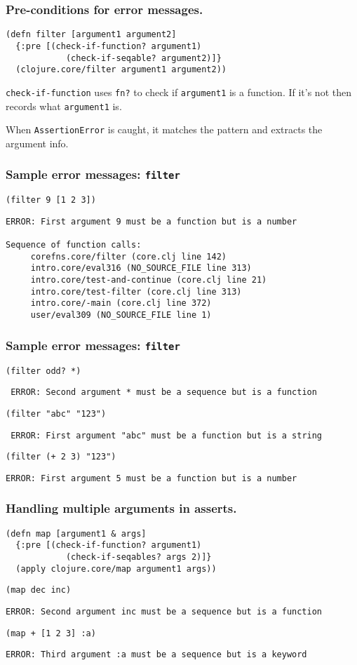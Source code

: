 \documentclass{beamer}
\begin{document}
\begin{frame}[fragile]
  \frametitle{Pre-conditions for error messages.}
\begin{verbatim}
(defn filter [argument1 argument2]
  {:pre [(check-if-function? argument1) 
            (check-if-seqable? argument2)]}
  (clojure.core/filter argument1 argument2))
\end{verbatim}
{\tt check-if-function} uses {\tt fn?} to check if {\tt argument1} is a function. 
If it's not then records what {\tt argument1} is. 

When {\tt AssertionError} is caught, it matches the pattern and extracts the argument info. 
\end{frame}

\begin{frame}[fragile]
  \frametitle{Sample error messages: {\tt filter}}
{\tt (filter 9 [1 2 3])}

\begin{verbatim}
ERROR: First argument 9 must be a function but is a number

Sequence of function calls:
     corefns.core/filter (core.clj line 142)
     intro.core/eval316 (NO_SOURCE_FILE line 313)
     intro.core/test-and-continue (core.clj line 21)
     intro.core/test-filter (core.clj line 313)
     intro.core/-main (core.clj line 372)
     user/eval309 (NO_SOURCE_FILE line 1)
\end{verbatim}
\end{frame}

\begin{frame}[fragile]
  \frametitle{Sample error messages: {\tt filter}}
{\tt (filter odd? *)}

{\tt 
ERROR: Second argument * must be a sequence but is a function
}

{\tt (filter "abc" "123")}

{\tt 
ERROR: First argument "abc" must be a function but is a string}

{\tt (filter (+ 2 3) "123")}

{\tt ERROR: First argument 5 must be a function but is a number}

\end{frame}

\begin{frame}[fragile]
  \frametitle{Handling multiple arguments in asserts.}
\begin{verbatim}
(defn map [argument1 & args]
  {:pre [(check-if-function? argument1) 
            (check-if-seqables? args 2)]}
  (apply clojure.core/map argument1 args))
\end{verbatim}

{\tt (map dec inc)}

{\tt ERROR: Second argument inc must be a sequence but is a function}

{\tt (map + [1 2 3] :a)}

{\tt ERROR: Third argument :a must be a sequence but is a keyword}
\end{frame}
\end{document}
